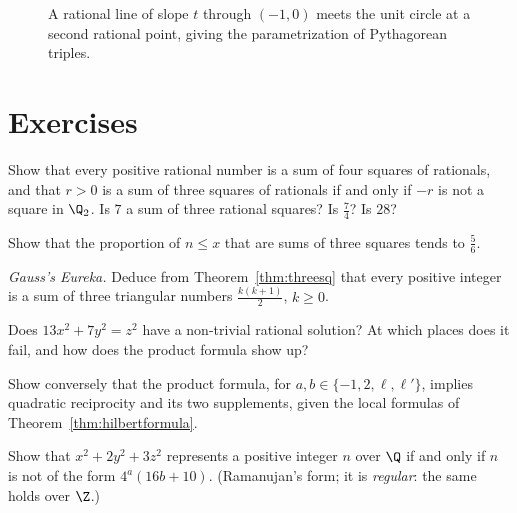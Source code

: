 \begin{figure}[ht]
\centering
{}
\caption{A rational line of slope $t$ through $(-1,0)$ meets the unit circle at a second rational point, giving the parametrization of Pythagorean triples.}
\label{fig:v13-extra-10-b}
\end{figure}

\section{Exercises}

\begin{exercise}[$\star$]\label{ex:fourrat}
Show that every positive rational number is a sum of four squares of rationals, and that $r>0$ is a sum of three squares of
rationals if and only if $-r$ is not a square in $\Q_2$. Is $7$ a sum of three rational squares? Is $\frac7{4}$? Is $28$?
\end{exercise}

\begin{exercise}[$\star$]\label{ex:fivesixths}
Show that the proportion of $n\le x$ that are sums of three squares tends to $\frac56$.
\end{exercise}

\begin{exercise}[$\star\star$]\label{ex:eureka}
\emph{Gauss's Eureka.} Deduce from Theorem~\ref{thm:threesq} that every positive integer is a sum of three triangular numbers
$\frac{k(k+1)}2$, $k\ge0$.
\end{exercise}

\begin{exercise}[$\star\star$]\label{ex:legendre13}
Does $13x^2+7y^2=z^2$ have a non-trivial rational solution? At which places does it fail, and how does the product formula show
up?
\end{exercise}

\begin{exercise}[$\star\star$]\label{ex:prodQR}
Show conversely that the product formula, for $a,b\in\{-1,2,\ell,\ell'\}$, implies quadratic reciprocity and its two supplements,
given the local formulas of Theorem~\ref{thm:hilbertformula}.
\end{exercise}

\begin{exercise}[$\star\star$]\label{ex:x2y3z}
Show that $x^2+2y^2+3z^2$ represents a positive integer $n$ over $\Q$ if and only if $n$ is not of the form $4^a(16b+10)$.
(Ramanujan's form; it is \emph{regular}: the same holds over $\Z$.)
\end{exercise}


